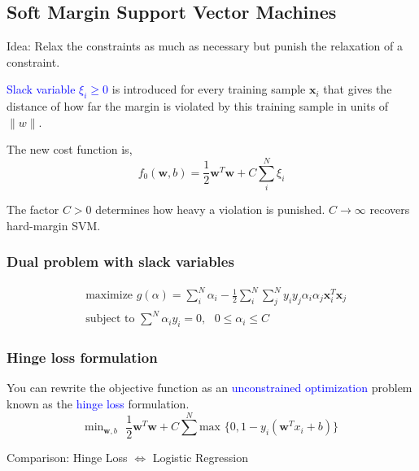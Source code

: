 \documentclass[a4paper,10pt,twoside=true,DIV=10,headsepline,plainheadsepline]{scrartcl}
\begin{document}
		\subsection{Soft Margin Support Vector Machines}
		Idea: Relax the constraints as much as necessary but punish the relaxation of a constraint.
		\newline

		\textcolor{blue}{Slack variable $\xi_i \geq 0$ } is introduced for every training sample $\mathbf{x}_i$ that gives the distance of how far the margin is violated by this training sample in units of $ \| w \|$.
		\newline

		The new cost function is,
			\begin{equation} 
				f_0(\mathbf{w}, b) = \frac{1}{2} \mathbf{w}^T \mathbf{w} + C \sum_i^N \xi_i
			\end{equation}
 
		The factor $C > 0$ determines how heavy a violation is punished. $C \rightarrow \infty$ recovers hard-margin SVM.
		
		\subsubsection{Dual problem with slack variables}
			\begin{align}
				&\textrm{maximize } g(\alpha) = \sum_i^N \alpha_i - \frac{1}{2} \sum_i^N \sum_j^N y_i y_j \alpha_i \alpha_j \mathbf{x}_i^T \mathbf{x}_j \\
				&\textrm{subject to } \sum^N \alpha_i y_i = 0, \textrm{ } 0 \leq \alpha_i \leq C
			\end{align}
		
		\subsubsection{Hinge loss formulation}
		You can rewrite the objective function as an \textcolor{blue}{unconstrained optimization} problem known as the \textcolor{blue}{hinge loss} formulation.
			\begin{equation} 
				\textrm{min}_{\mathbf{w},b} \textrm{ } \frac{1}{2} \mathbf{w}^T \mathbf{w} + C \sum^N \textrm{max } \{0, 1 - y_i (\mathbf{w}^T x_i + b) \}
			\end{equation}
			\newline

		Comparison: Hinge Loss $\Leftrightarrow$ Logistic Regression
\end{document}
